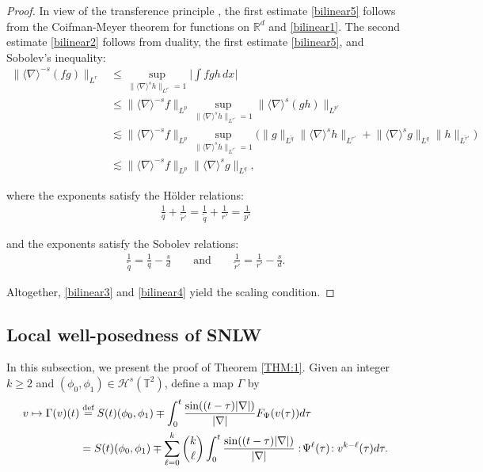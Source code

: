 \documentclass[letterpaper, 11pt,  reqno]{amsart}
\newcommand{\1}{\hspace{0.5mm}\text{I}\hspace{0.5mm}}
\newcommand{\noi}{\noindent}
\newcommand{\R}{\mathbb{R}}
\newcommand{\T}{\mathbb{T}}
\newcommand{\nb}{\nabla}
\newcommand{\G}{\Gamma}
\newcommand{\wt}{\widetilde}
\renewcommand{\l}{\ell}
\newcommand{\les}{\lesssim}
\newcommand{\jb}[1]
{\langle #1 \rangle}
\renewcommand{\H}{\mathcal{H}}
\numberwithin{equation}{section}
\numberwithin{theorem}{section}
\begin{document}
\begin{proof} 
In view of the transference principle \cite[Theorem 3]{FS}, 
the first estimate \eqref{bilinear5} follows from the Coifman-Meyer theorem 
for functions on $\R^d$
and \eqref{bilinear1}.
 The second estimate \eqref{bilinear2} follows 
 from  duality, the first estimate \eqref{bilinear5}, and Sobolev's inequality:
\begin{align*}
  \big\| \jb{\nb}^{-s} (fg) \big\|_{L^r} 
  & \le  \sup_{\|\jb{\nb}^s h \|_{L^{r'}} =1}  \bigg|\int fgh \, dx \bigg|\\
 & \le \big\| \jb{\nb}^{-s} f \big\|_{L^p}   \sup_{\| \jb{\nb}^s h \|_{L^{r'}} =1} 
 \big\| \jb{\nb}^{s} (gh) \big\|_{L^{p'}} \\
 &  \les \big\| \jb{\nb}^{-s} f \big\|_{L^p}  
 \sup_{\| \jb{\nb}^s h \|_{L^{r'}} = 1} \Big( \| g \|_{L^{\wt  q}} \big\| \jb{\nb}^s h \big\|_{L^{r'}} 
+ \big\|\jb{\nb}^s g \big\|_{L^q} \| h \|_{L^{\wt r'} } \Big) \\
 &  \lesssim   \big\| \jb{\nb}^{-s} f \big\|_{L^p} \big\| \jb{\nb}^s g \big\|_{L^q}   , 
\end{align*}


\noi
where the exponents satisfy the H\"older relations: 
\begin{align}
 \frac1q + \frac1{\wt r'} = \frac1{\wt q} + \frac1{r'}=\frac{1}{p'} 
\label{bilinear3}
\end{align}

\noi
and 
the exponents satisfy the Sobolev relations: 
\begin{align}
 \frac1{\wt q} = \frac1q -\frac{s}{d}  
  \qquad \text{and}\qquad
  \frac1{\wt r'} = \frac1{r'} - \frac{s}d.  
\label{bilinear4}
\end{align}

\noi
Altogether, \eqref{bilinear3} and \eqref{bilinear4} yield the scaling condition. 
\end{proof} 









\subsection{Local well-posedness of SNLW}
\label{SUBSEC:3.3}


In this subsection, we present the proof of Theorem \ref{THM:1}.
Given an integer $k \geq 2$ and $(\phi_0, \phi_1) \in \H^s(\T^2)$, define a map $\G$ by 
\begin{align}
v \mapsto \G(v)(t)
& \stackrel{\text{def}}{=} 
S(t) (\phi_0, \phi_1)
 \mp \int_{0}^t  \frac{\sin ((t-\tau)|\nabla|)}{|\nabla|}
    F_\Psi(v(\tau)) d\tau \notag \\
& = S(t) (\phi_0, \phi_1)
 \mp  \sum_{\ell=0}^k {k\choose \ell} \int_{0}^t  \frac{\sin ((t-\tau)|\nabla|)}{|\nabla|}
 :\! \Psi^\l (\tau)  \!: v^{k-\l}(\tau ) d\tau.
\label{SNLW10}
\end{align}
\end{document}
